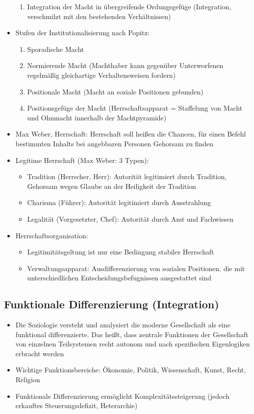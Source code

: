\documentclass{scrartcl}
\begin{document}
\begin{itemize}
\begin{enumerate}
	    \item
		Integration der Macht in übergreifende Ordungsgefüge (Integration, verschmilzt mit den bestehenden Verhältnissen)
	\end{enumerate}
    \item
	Stufen der Institutionalisierung nach Popitz:
	\begin{enumerate}
	    \item
		Sporadische Macht
	    \item
		Normierende Macht (Machthaber kann gegenüber Unterworfenen regelmäßig gleichartige Verhaltensweisen fordern)
	    \item
		Positionale Macht (Macht an soziale Positionen gebunden)
	    \item
		Positionsgefüge der Macht (Herrschaftsapparat = Staffelung von Macht und Ohnmacht innerhalb der Machtpyramide)
	\end{enumerate}
    \item
	Max Weber, Herrschaft: Herrschaft soll heißen die Chancen, für einen Befehl bestimmten Inhalts bei angebbaren Personen Gehorsam zu finden
    \item
	Legitime Herrschaft (Max Weber: 3 Typen):
	\begin{itemize}
	    \item
		Tradition (Herrscher, Herr): Autorität legitimiert durch Tradition, Gehorsam wegen Glaube an der Heiligkeit der Tradition
	    \item
		Charisma (Führer): Autorität legitimiert durch Ausstrahlung
	    \item
		Legalität (Vorgesetzter, Chef): Autorität durch Amt und Fachwissen
	\end{itemize}
    \item
	Herrschaftsorganisation:
	\begin{itemize}
	    \item
		Legitimitätsgeltung ist nur eine Bedingung stabiler Herrschaft
	    \item
		Verwaltungsapparat: Ausdifferenzierung von sozialen Positionen, die mit unterschiedlichen Entscheidungsbefugnissen ausgestattet sind
	\end{itemize}
\end{itemize}

\subsection*{Funktionale Differenzierung (Integration)}
\begin{itemize}
    \item
	Die Soziologie versteht und analysiert die moderne Gesellschaft als eine funktional differenzierte. Das heißt, dass zentrale Funktionen der Gesellschaft von einzelnen Teilsystemen recht autonom und nach spezifischen Eigenlogiken erbracht werden
    \item
	Wichtige Funktionsbereiche: Ökonomie, Politik, Wissenschaft, Kunst, Recht, Religion
    \item
	Funktionale Differenzierung ermöglicht Komplexitätssteigerung (jedoch erkauftes Steuerungsdefizit, Heterarchie)
\end{itemize}
\end{document}
